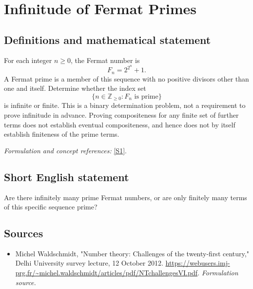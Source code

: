 \documentclass[11pt]{article}
\begin{document}
\section*{\texorpdfstring{Infinitude of Fermat Primes}{Infinitude of Fermat Primes}}\label{476}
\subsection{Definitions and mathematical statement}
For each integer $n\ge0$, the Fermat number is
\[
 F_n=2^{2^n}+1.
\]
A Fermat prime is a member of this sequence with no positive divisors other than one and itself. Determine whether the index set
\[
 \{n\in{\mathbb{Z}}_{\ge0}:F_n\text{ is prime}\}
\]
is infinite or finite. This is a binary determination problem, not a requirement to prove infinitude in advance. Proving compositeness for any finite set of further terms does not establish eventual compositeness, and hence does not by itself establish finiteness of the prime terms.
\par\smallskip\textit{Formulation and concept references:} \href{https://webusers.imj-prg.fr/~michel.waldschmidt/articles/pdf/NTchallengesVI.pdf}{[S1]}.

\subsection{Short English statement}
Are there infinitely many prime Fermat numbers, or are only finitely many terms of this specific sequence prime?
\subsection{Sources}
\begin{itemize}
\item[S1]Michel Waldschmidt, "Number theory: Challenges of the twenty-first century," Delhi University survey lecture, 12 October 2012.
\url{https://webusers.imj-prg.fr/~michel.waldschmidt/articles/pdf/NTchallengesVI.pdf}.
\textit{Formulation source.}
\end{itemize}
\end{document}
